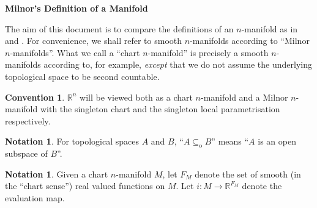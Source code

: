 \documentclass[10pt]{amsart}
\theoremstyle{definition}
\newtheorem{notn}[thm]{Notation}
\newtheorem{conv}[thm]{Convention}
\begin{document}
\thispagestyle{empty}
\begin{center}
 \textbf{\large Milnor's Definition of a Manifold} 
\end{center}
\vspace{0.2cm}
The aim of this document is to compare the definitions of an $n$-manifold as in \cite{Mil} and \cite{Lee}. For convenience, we shall refer to smooth $n$-manifolds according to \cite{Mil} ``Milnor $n$-manifolds''. What we call a ``chart $n$-manifold'' is precisely a smooth $n$-manifolds according to, for example, \cite{Lee} \emph{except} that we do not assume the underlying topological space to be second countable.

\begin{conv}
 $\mathbb{R} ^{n}$ will be viewed both as a chart $n$-manifold and a Milnor $n$-manifold with the singleton chart and the singleton local parametrisation respectively.
\end{conv}
\begin{notn}
 For topological spaces $A$ and $B$, ``$A\subseteq_{\text{o} } B$'' means ``$A$ is an open subspace of $B$''.  
\end{notn}

\begin{notn}
 Given a chart $n$-manifold $M$, let $F_{M}$ denote the set of smooth (in the ``chart sense'') real valued functions on $M$. Let $i : M \rightarrow \mathbb{R} ^{F_{M}} $ denote the evaluation map. 
\end{notn}
\end{document}
